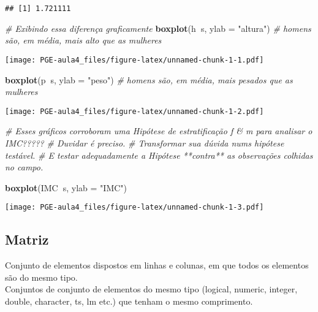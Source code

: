 \documentclass[]{article}
\newenvironment{Shaded}{\begin{snugshade}}{\end{snugshade}}
\newcommand{\KeywordTok}[1]{\textcolor[rgb]{0.13,0.29,0.53}{\textbf{#1}}}
\newcommand{\DataTypeTok}[1]{\textcolor[rgb]{0.13,0.29,0.53}{#1}}
\newcommand{\StringTok}[1]{\textcolor[rgb]{0.31,0.60,0.02}{#1}}
\newcommand{\CommentTok}[1]{\textcolor[rgb]{0.56,0.35,0.01}{\textit{#1}}}
\newcommand{\OperatorTok}[1]{\textcolor[rgb]{0.81,0.36,0.00}{\textbf{#1}}}
\newcommand{\NormalTok}[1]{#1}
\begin{document}
\begin{verbatim}
## [1] 1.721111
\end{verbatim}

\begin{Shaded}
\begin{Highlighting}[]
\CommentTok{# Exibindo essa diferença graficamente}
\KeywordTok{boxplot}\NormalTok{(h}\OperatorTok{~}\NormalTok{s, }\DataTypeTok{ylab =} \StringTok{"altura"}\NormalTok{) }\CommentTok{# homens são, em média, mais alto que as mulheres}
\end{Highlighting}
\end{Shaded}

\texttt{[image: PGE-aula4\_files/figure-latex/unnamed-chunk-1-1.pdf]}

\begin{Shaded}
\begin{Highlighting}[]
\KeywordTok{boxplot}\NormalTok{(p}\OperatorTok{~}\NormalTok{s, }\DataTypeTok{ylab =} \StringTok{"peso"}\NormalTok{) }\CommentTok{# homens são, em média, mais pesados que as mulheres}
\end{Highlighting}
\end{Shaded}

\texttt{[image: PGE-aula4\_files/figure-latex/unnamed-chunk-1-2.pdf]}

\begin{Shaded}
\begin{Highlighting}[]
\CommentTok{# Esses gráficos corroboram uma Hipótese de estratificação f & m para analisar o IMC?????}
\CommentTok{# Duvidar é preciso.}
\CommentTok{# Transformar sua dúvida nums hipótese testável.}
\CommentTok{# E testar adequadamente a Hipótese **contra** as observações colhidas no campo.}

\KeywordTok{boxplot}\NormalTok{(IMC}\OperatorTok{~}\NormalTok{s, }\DataTypeTok{ylab =} \StringTok{"IMC"}\NormalTok{)}
\end{Highlighting}
\end{Shaded}

\texttt{[image: PGE-aula4\_files/figure-latex/unnamed-chunk-1-3.pdf]}

\subsection{Matriz}\label{matriz}

Conjunto de elementos dispostos em linhas e colunas, em que todos os
elementos são do mesmo tipo.\\
Conjuntos de conjunto de elementos do mesmo tipo (logical, numeric,
integer, double, character, ts, lm etc.) que tenham o mesmo comprimento.
\end{document}
